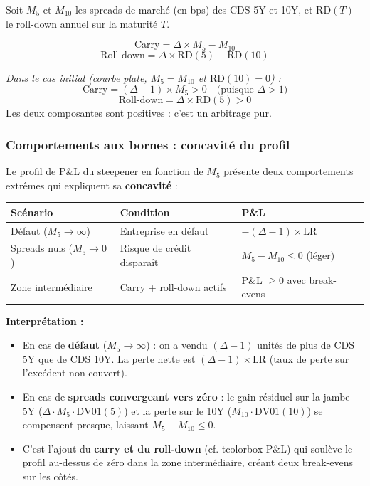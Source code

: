 Soit $M_5$ et $M_{10}$ les spreads de marché (en bps) des CDS 5Y et 10Y, et $\mathrm{RD}(T)$ le roll-down annuel sur la maturité $T$.

\begin{tcolorbox}[colback=orange!5,colframe=orange!60,title=P\&L du Steepener (DV01-neutre)]
\[
\text{Carry} = \Delta \times M_5 - M_{10}
\]
\[
\text{Roll-down} = \Delta \times \mathrm{RD}(5) - \mathrm{RD}(10)
\]
\end{tcolorbox}

\textit{Dans le cas initial (courbe plate, $M_5 = M_{10}$ et $\mathrm{RD}(10)=0$) :}
\[
\text{Carry} = (\Delta - 1) \times M_5 > 0 \quad \text{(puisque } \Delta > 1\text{)}
\]
\[
\text{Roll-down} = \Delta \times \mathrm{RD}(5) > 0
\]
Les deux composantes sont positives : c'est un arbitrage pur.

\subsubsection*{Comportements aux bornes : concavité du profil}

Le profil de P\&L du steepener en fonction de $M_5$ présente deux comportements extrêmes qui expliquent sa \textbf{concavité} :

\begin{center}
\renewcommand{\arraystretch}{1.3}
\begin{tabular}{|l|l|l|}
\hline
\textbf{Scénario} & \textbf{Condition} & \textbf{P\&L} \\
\hline
Défaut ($M_5 \to \infty$) & Entreprise en défaut & $-(\Delta - 1) \times \mathrm{LR}$ \\
\hline
Spreads nuls ($M_5 \to 0$) & Risque de crédit disparaît & $M_5 - M_{10} \leq 0$ (léger) \\
\hline
Zone intermédiaire & Carry + roll-down actifs & P\&L $\geq 0$ avec break-evens \\
\hline
\end{tabular}
\end{center}

\textbf{Interprétation :}
\begin{itemize}
    \item En cas de \textbf{défaut} ($M_5 \to \infty$) : on a vendu $(\Delta - 1)$ unités de plus de CDS 5Y que de CDS 10Y. La perte nette est $(\Delta - 1) \times \mathrm{LR}$ (taux de perte sur l'excédent non couvert).
    \item En cas de \textbf{spreads convergeant vers zéro} : le gain résiduel sur la jambe 5Y ($\Delta \cdot M_5 \cdot \mathrm{DV01}(5)$) et la perte sur le 10Y ($M_{10} \cdot \mathrm{DV01}(10)$) se compensent presque, laissant $M_5 - M_{10} \leq 0$.
    \item C'est l'ajout du \textbf{carry et du roll-down} (cf. tcolorbox P\&L) qui soulève le profil au-dessus de zéro dans la zone intermédiaire, créant deux break-evens sur les côtés.
\end{itemize}

